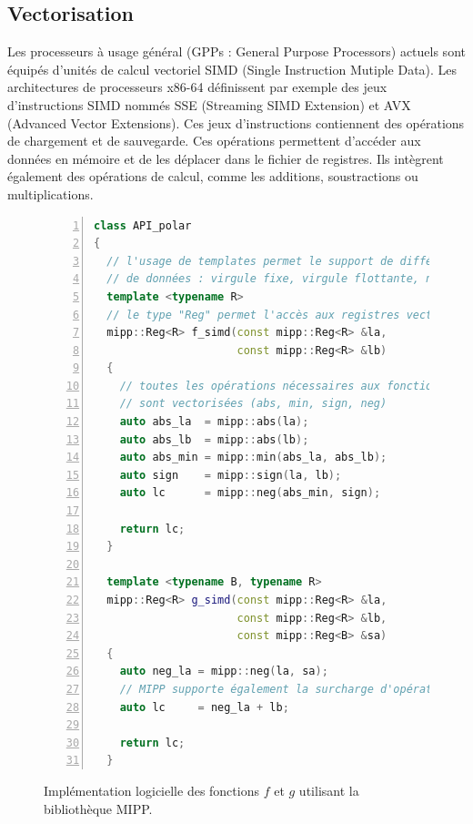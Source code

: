 \subsection{Vectorisation}


Les processeurs à usage général (GPPs : General Purpose Processors) actuels sont équipés d'unités de calcul vectoriel SIMD (Single Instruction Mutiple Data). Les architectures de processeurs x86-64 définissent par exemple des jeux d'instructions SIMD nommés SSE (Streaming SIMD Extension) et AVX (Advanced Vector Extensions). Ces jeux d'instructions contiennent des opérations de chargement et de sauvegarde. Ces opérations permettent d'accéder aux données en mémoire et de les déplacer dans le fichier de registres. Ils intègrent également des opérations de calcul, comme les additions, soustractions ou multiplications.
\begin{figure}[htp]
\begin{lstlisting}[language=C++, numbers=left, numbersep=0.3em, tabsize=2, basicstyle=\footnotesize\ttfamily]
class API_polar
{
  // l'usage de templates permet le support de différents formats
  // de données : virgule fixe, virgule flottante, nombre de bits
  template <typename R>
  // le type "Reg" permet l'accès aux registres vectoriels
  mipp::Reg<R> f_simd(const mipp::Reg<R> &la,
                      const mipp::Reg<R> &lb)
  {
    // toutes les opérations nécessaires aux fonctions polaires
    // sont vectorisées (abs, min, sign, neg)
    auto abs_la  = mipp::abs(la);
    auto abs_lb  = mipp::abs(lb);
    auto abs_min = mipp::min(abs_la, abs_lb);
    auto sign    = mipp::sign(la, lb);
    auto lc      = mipp::neg(abs_min, sign);

    return lc;
  }

  template <typename B, typename R>
  mipp::Reg<R> g_simd(const mipp::Reg<R> &la,
                      const mipp::Reg<R> &lb,
                      const mipp::Reg<B> &sa)
  {
    auto neg_la = mipp::neg(la, sa);
    // MIPP supporte également la surcharge d'opérateurs
    auto lc     = neg_la + lb;

    return lc;
  }

  \end{lstlisting}
  \caption{Implémentation logicielle des fonctions $f$ et $g$ utilisant la bibliothèque MIPP.}
  \label{fig:mipp}
  \end{figure}

